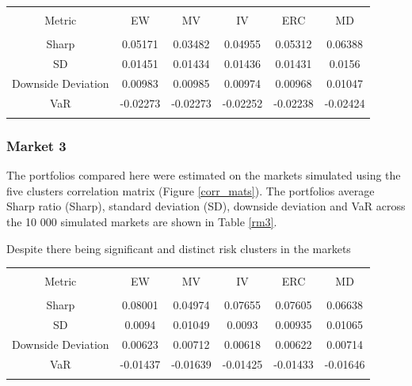 \documentclass[11pt,preprint, authoryear]{elsarticle}
\let\origtable\table
\let\endorigtable\endtable
\renewenvironment{table}[1][2] {
    \expandafter\origtable\expandafter[H]
} {
    \endorigtable
}
\numberwithin{equation}{section}
\numberwithin{figure}{section}
\numberwithin{table}{section}
\begin{document}
\begin{table}[!htbp] \centering 
  \caption{Market 2 Risk Metrics} 
  \label{rm2} 
\begin{tabular}{@{\extracolsep{5pt}} cccccc} 
\\[-1.8ex]\hline 
\hline \\[-1.8ex] 
Metric & EW & MV & IV & ERC & MD \\ 
\hline \\[-1.8ex] 
Sharp & 0.05171 & 0.03482 & 0.04955 & 0.05312 & 0.06388 \\ 
SD & 0.01451 & 0.01434 & 0.01436 & 0.01431 & 0.0156 \\ 
Downside Deviation & 0.00983 & 0.00985 & 0.00974 & 0.00968 & 0.01047 \\ 
VaR & -0.02273 & -0.02273 & -0.02252 & -0.02238 & -0.02424 \\ 
\hline \\[-1.8ex] 
\end{tabular} 
\end{table}

\hypertarget{market-3}{%
\subsubsection{Market 3}\label{market-3}}

The portfolios compared here were estimated on the markets simulated
using the five clusters correlation matrix (Figure \ref{corr_mats}). The
portfolios average Sharp ratio (Sharp), standard deviation (SD),
downside deviation and VaR across the 10 000 simulated markets are shown
in Table \ref{rm3}.

Despite there being significant and distinct risk clusters in the
markets

\begin{table}[!htbp] \centering 
  \caption{Market 3 Risk Metrics} 
  \label{rm3} 
\begin{tabular}{@{\extracolsep{5pt}} cccccc} 
\\[-1.8ex]\hline 
\hline \\[-1.8ex] 
Metric & EW & MV & IV & ERC & MD \\ 
\hline \\[-1.8ex] 
Sharp & 0.08001 & 0.04974 & 0.07655 & 0.07605 & 0.06638 \\ 
SD & 0.0094 & 0.01049 & 0.0093 & 0.00935 & 0.01065 \\ 
Downside Deviation & 0.00623 & 0.00712 & 0.00618 & 0.00622 & 0.00714 \\ 
VaR & -0.01437 & -0.01639 & -0.01425 & -0.01433 & -0.01646 \\ 
\hline \\[-1.8ex] 
\end{tabular} 
\end{table}
\end{document}
